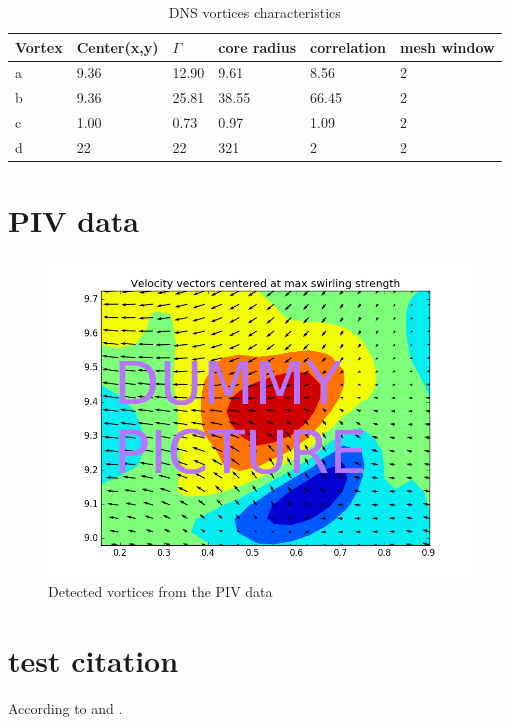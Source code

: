 \documentclass[12pt, a4paper, openany]{memoir}
\begin{document}
\begin{table}[h]
	\centering
	\caption{DNS vortices characteristics}
	\vspace{10px}
	\label{tb:DNSvortices}
	\begin{tabular}{l|l|l|l|l|l}
		Vortex         & Center(x,y) & $\Gamma$    & core radius   & correlation & mesh window \\
		\hline
		a  & 9.36  & 12.90  & 9.61 &  8.56 & 2 \\
		b      & 9.36  & 25.81  & 38.55& 66.45 & 2 \\
		c    & 1.00  & 0.73   & 0.97 & 1.09 & 2\\
		d    & 22   &   22   &   321 & 2 & 2
	\end{tabular}
\end{table}
  

\section{PIV data}

\begin{figure}[h]
	\centering
	\label{fig:detectionPIV}
	\includegraphics[scale=0.5]{figure/dummy.png}
	\caption{Detected vortices from the PIV data}
\end{figure}

\section{test citation}
According to \cite{herpin2009} and \cite{raoul2016}.





\newpage



\appendix

\end{document}
